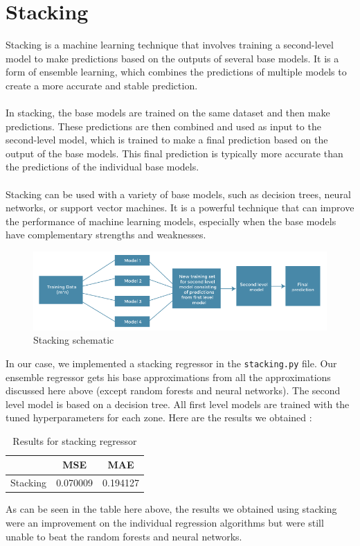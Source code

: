 \section{Stacking}
Stacking is a machine learning technique that involves training a second-level model to make predictions based on the outputs of several base models. It is a form of ensemble learning, which combines the predictions of multiple models to create a more accurate and stable prediction.
\\\\
In stacking, the base models are trained on the same dataset and then make predictions. These predictions are then combined and used as input to the second-level model, which is trained to make a final prediction based on the output of the base models. This final prediction is typically more accurate than the predictions of the individual base models.
\\\\
Stacking can be used with a variety of base models, such as decision trees, neural networks, or support vector machines. It is a powerful technique that can improve the performance of machine learning models, especially when the base models have complementary strengths and weaknesses.

\begin{figure}[H]
    \centering
    \includegraphics[width=.7\textwidth]{figs/stacking.png}
    \caption{Stacking schematic}
    \label{fig:stacking}
\end{figure}

In our case, we implemented a stacking regressor in the \verb|stacking.py| file. Our ensemble regressor gets his base approximations from all the approximations discussed here above (except random forests and neural networks). The second level model is based on a decision tree. All first level models are trained with the tuned hyperparameters for each zone. Here are the results we obtained :

\begin{table}[H]
\centering
\begin{tabular}{|c|c|c|}
\hline
         & MSE      & MAE      \\ \hline
Stacking & 0.070009 & 0.194127 \\ \hline
\end{tabular}
\caption{Results for stacking regressor}
\label{tab:stacking}
\end{table}

As can be seen in the table here above, the results we obtained using stacking were an improvement on the individual regression algorithms but were still unable to beat the random forests and neural networks.